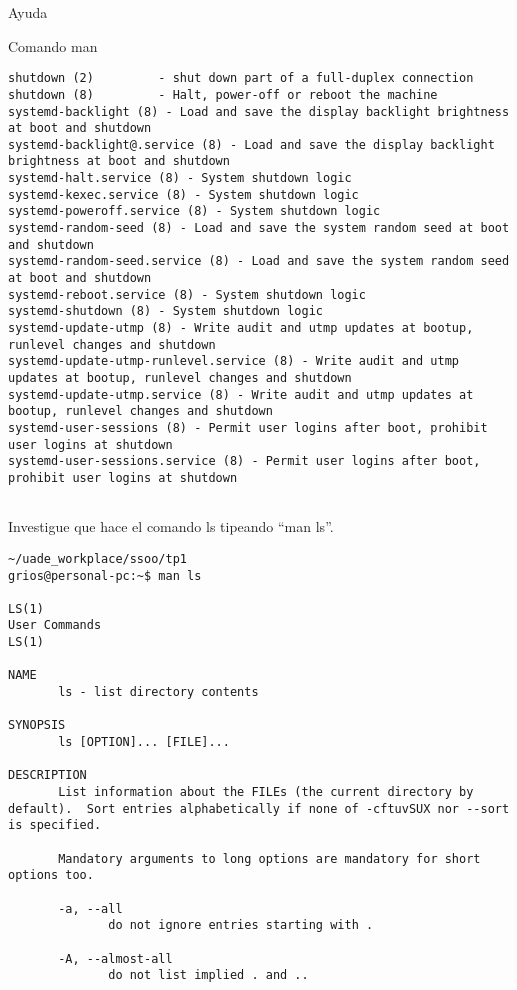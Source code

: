 \begin{section}{Ayuda}
\begin{subsection}{Comando man}
\begin{lstlisting}[style=Ubuntu]
shutdown (2)         - shut down part of a full-duplex connection
shutdown (8)         - Halt, power-off or reboot the machine
systemd-backlight (8) - Load and save the display backlight brightness at boot and shutdown
systemd-backlight@.service (8) - Load and save the display backlight brightness at boot and shutdown
systemd-halt.service (8) - System shutdown logic
systemd-kexec.service (8) - System shutdown logic
systemd-poweroff.service (8) - System shutdown logic
systemd-random-seed (8) - Load and save the system random seed at boot and shutdown
systemd-random-seed.service (8) - Load and save the system random seed at boot and shutdown
systemd-reboot.service (8) - System shutdown logic
systemd-shutdown (8) - System shutdown logic
systemd-update-utmp (8) - Write audit and utmp updates at bootup, runlevel changes and shutdown
systemd-update-utmp-runlevel.service (8) - Write audit and utmp updates at bootup, runlevel changes and shutdown
systemd-update-utmp.service (8) - Write audit and utmp updates at bootup, runlevel changes and shutdown
systemd-user-sessions (8) - Permit user logins after boot, prohibit user logins at shutdown
systemd-user-sessions.service (8) - Permit user logins after boot, prohibit user logins at shutdown


\end{lstlisting}

\begin{quoting}
Investigue que hace el comando ls tipeando “man ls”.
\end{quoting}

\begin{lstlisting}[style=Ubuntu]
~/uade_workplace/ssoo/tp1
grios@personal-pc:~$ man ls

LS(1)                                                              User Commands                                                             LS(1)

NAME
       ls - list directory contents

SYNOPSIS
       ls [OPTION]... [FILE]...

DESCRIPTION
       List information about the FILEs (the current directory by default).  Sort entries alphabetically if none of -cftuvSUX nor --sort is specified.

       Mandatory arguments to long options are mandatory for short options too.

       -a, --all
              do not ignore entries starting with .

       -A, --almost-all
              do not list implied . and ..


\end{lstlisting}
\end{subsection}
\end{section}
